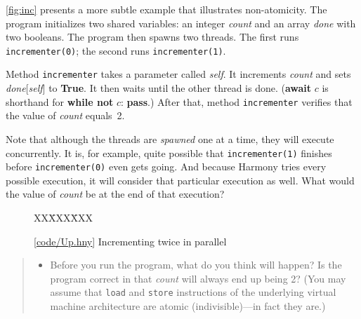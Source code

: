 \documentclass{report}
\newcommand{\harmonysource}[1]{
\begin{tabbing}
XX\=XXX\=XXX\kill
    
\end{tabbing}
}
\newcommand{\harmonylink}[1]{%
[\href{https://harmony.cs.cornell.edu/#1}{\underline{#1}}]%
}
\newenvironment{code}{
\tcolorbox
}{
\endtcolorbox
}
\begin{document}
\autoref{fig:inc} presents a more subtle example that illustrates
non-atomicity.
The program initializes two shared variables:
an integer \textit{count} and
an array \textit{done} with two booleans.
The program then spawns two threads.
The first runs \texttt{incrementer(0)}; the second runs
\texttt{incrementer(1)}.

Method \texttt{incrementer} takes a parameter called \textit{self}.
It increments \textit{count} and sets \textit{done}[\textit{self}] to \textbf{True}.
It then waits until the other thread is done.
(\textbf{await} $c$ is shorthand for \textbf{while not} $c$: \textbf{pass}.)
After that, method \texttt{incrementer}
verifies that the value of \textit{count} equals~2.

Note that although the threads are \emph{spawned} one at a time,
they will execute concurrently.  It is, for example, quite possible
that \texttt{incrementer(1)} finishes before \texttt{incrementer(0)}
even gets going.
And because Harmony tries every possible execution, it will consider
that particular execution as well.
What would the value of \textit{count} be at the end of that execution?

\begin{figure}[h]
\begin{code}
\harmonysource{Up}
\end{code}
\caption{\harmonylink{code/Up.hny} Incrementing twice in parallel}
\label{fig:inc}
\end{figure}

\begin{quote}
\begin{itemize}
\item Before you run the program, what do you think will happen?  Is the
program correct in that \textit{count} will always end up being 2?
(You may assume that \texttt{load} and \texttt{store} instructions of the
underlying virtual machine architecture are atomic (indivisible)---in fact
they are.)
\end{itemize}
\end{quote}

%
\end{document}
